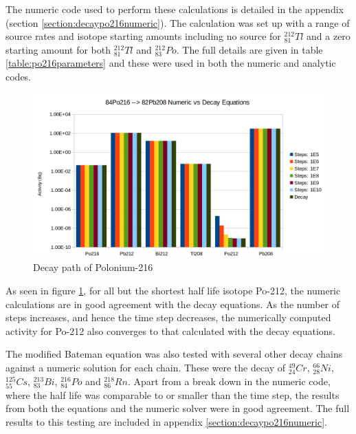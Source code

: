 The numeric code used to perform these calculations is detailed in the appendix (section \ref{section:decaypo216numeric}).  The calculation was set up with a range of source rates and isotope starting amounts including no source for ${}^{212}_{81}Tl$ and a zero starting amount for both ${}^{212}_{81}Tl$ and ${}^{212}_{83}Po$.  The full details are given in table \ref{table:po216parameters} and these were used in both the numeric and analytic codes.

\FloatBarrier
\begin{figure}[h]
  \begin{center}
    \includegraphics[width=0.7\linewidth]{chapters/activity_code/84po216/decay_84Po216.png}
    \caption{Decay path of Polonium-216}
    \label{fig:decay_equations_vs_analytic}
  \end{center}
\end{figure}

As seen in figure \ref{fig:decay_equations_vs_analytic}, for all but the shortest half life isotope Po-212, the numeric calculations are in good agreement with the decay equations.  As the number of steps increases, and hence the time step decreases, the numerically computed activity for Po-212 also converges to that calculated with the decay equations.

The modified Bateman equation was also tested with several other decay chains against a numeric solution for each chain.  These were the decay of ${}^{49}_{24}Cr$, ${}^{66}_{28}Ni$, ${}^{125}_{55}Cs$, ${}^{213}_{83}Bi$, ${}^{216}_{84}Po$ and ${}^{218}_{86}Rn$.  Apart from a break down in the numeric code, where the half life was comparable to or smaller than the time step, the results from both the equations and the numeric solver were in good agreement.  The full results to this testing are included in appendix \ref{section:decaypo216numeric}.


\FloatBarrier

